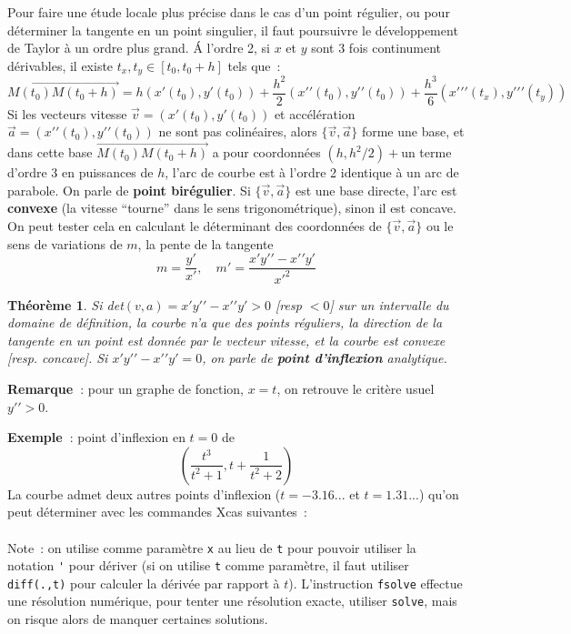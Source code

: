 \documentclass[a4paper,11pt]{book}
\newtheorem{thm}{Théorème}
\begin{document}
\begin{giacjshere}
Pour faire une \'etude locale plus pr\'ecise dans le cas d'un point
r\'egulier, ou pour d\'eterminer la tangente en un point singulier,
il faut poursuivre le d\'eveloppement de Taylor \`a un ordre plus
grand. \'A l'ordre 2, si $x$ et $y$ sont 3 fois continument
d\'erivables, il existe $t_x,t_y\in [t_0,t_0+h]$ tels que~:
$$\overrightarrow{M(t_0)M(t_0+h)}= 
h (x'(t_0),y'(t_0))+\frac{h^2}{2}(x'{'}(t_0),y'{'}(t_0))
+\frac{h^3}{6}(x'{'}'(t_x),y'{'}'(t_y))
$$
Si les vecteurs vitesse $\overrightarrow{v}=(x'(t_0),y'(t_0))$
et acc\'el\'eration $\overrightarrow{a}=(x'{'}(t_0),y'{'}(t_0))$
ne sont pas colin\'eaires, 
alors $\{\overrightarrow{v},\overrightarrow{a}\}$ forme 
une base, et dans cette base $\overrightarrow{M(t_0)M(t_0+h)}$
a pour coordonn\'ees $(h,h^2/2)+$un terme d'ordre 3 en puissances de $h$, l'arc
de courbe est \`a l'ordre 2 identique \`a un arc de parabole. 
On parle de {\bf point bir\'egulier}.
Si $\{\overrightarrow{v},\overrightarrow{a}\}$ est une base directe,
l'arc est {\bf convexe} (la vitesse
``tourne'' dans le sens trigonom\'etrique),
sinon il est concave. On peut tester cela en calculant
le d\'eterminant des coordonn\'ees de 
$\{\overrightarrow{v},\overrightarrow{a}\}$ ou le sens
de variations de $m$, la pente de la tangente 
\[ m=\frac{y'}{x'}, \quad m'=\frac{x'y'{'}-x'{'}y'}{x'^2} \]

\begin{thm}
Si det$(v,a)=x'y'{'}-x'{'}y'>0$ [resp $<0$] 
sur un intervalle du domaine de d\'efinition,
la courbe n'a que des points r\'eguliers, 
la direction de la tangente en un point
est donn\'ee par le vecteur vitesse, et la courbe est convexe
[resp. concave].
Si $x'y'{'}-x'{'}y'=0$, on parle de 
{\bf point d'inflexion} analytique.
\end{thm}
{\bf Remarque~}: pour un graphe de fonction, $x=t$, on retrouve le
crit\`ere usuel $y'{'}>0$.

{\bf Exemple~}: point d'inflexion en $t=0$ de
$$ (\frac{t^3}{t^2+1},t+\frac{1}{t^2+2}) $$
La courbe admet deux autres points d'inflexion ($t=-3.16...$ et
$t=1.31...$) qu'on peut d\'eterminer avec les commandes Xcas suivantes~:\\
\\
Note~: on utilise comme param\`etre \verb|x| au lieu de \verb|t| pour pouvoir 
utiliser la notation \verb|'| pour d\'eriver (si on utilise \verb|t|
comme param\`etre, il faut utiliser \verb|diff(.,t)| pour calculer
la d\'eriv\'ee par rapport \`a $t$). L'instruction \verb|fsolve|
effectue une r\'esolution num\'erique, pour tenter une r\'esolution
exacte, utiliser \verb|solve|, mais on risque alors de manquer
certaines solutions.


\end{giacjshere}
\end{document}
